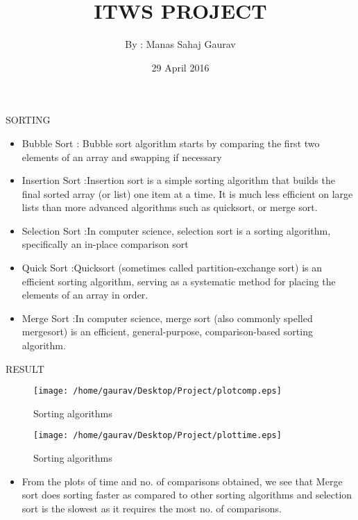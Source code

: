 \documentclass{beamer}
\title[]{ITWS PROJECT}
\author[]{By : Manas Sahaj Gaurav }
\institute[]{Sorting Algorithms \& GNU ploting}
\date{29 April 2016}
\begin{document}
\begin{frame}
  \titlepage
\end{frame}





\begin{frame}{SORTING}



\begin{itemize}
\item Bubble Sort : Bubble sort algorithm starts by comparing the first two elements of an array and swapping if necessary
\item Insertion Sort :Insertion sort is a simple sorting algorithm that builds the final sorted array (or list) one item at a time. It is much less efficient on large lists than more advanced algorithms such as quicksort, or merge sort.
\item Selection Sort :In computer science, selection sort is a sorting algorithm, specifically an in-place comparison sort

\end{itemize}



\end{frame}
\begin{frame}
\begin{itemize}
\item Quick Sort :Quicksort (sometimes called partition-exchange sort) is an efficient sorting algorithm, serving as a systematic method for placing the elements of an array in order.
\item Merge Sort :In computer science, merge sort (also commonly spelled mergesort) is an efficient, general-purpose, comparison-based sorting algorithm.
\end{itemize}
\end{frame}

\begin{frame}{RESULT}
{
  \begin{figure}
    \centering
    \texttt{[image: /home/gaurav/Desktop/Project/plotcomp.eps]}
    \caption{Sorting algorithms}
  \end{figure}
  \begin{figure}
    \centering
    \texttt{[image: /home/gaurav/Desktop/Project/plottime.eps]}
    \caption{Sorting algorithms}
  \end{figure}
}

\begin{itemize}
\item From the plots of time and no. of comparisons obtained, we see that Merge sort does sorting faster as compared to other sorting algorithms and selection sort is the slowest as it requires the most no. of comparisons.
\end{itemize}


\end{frame}
\end{document}
